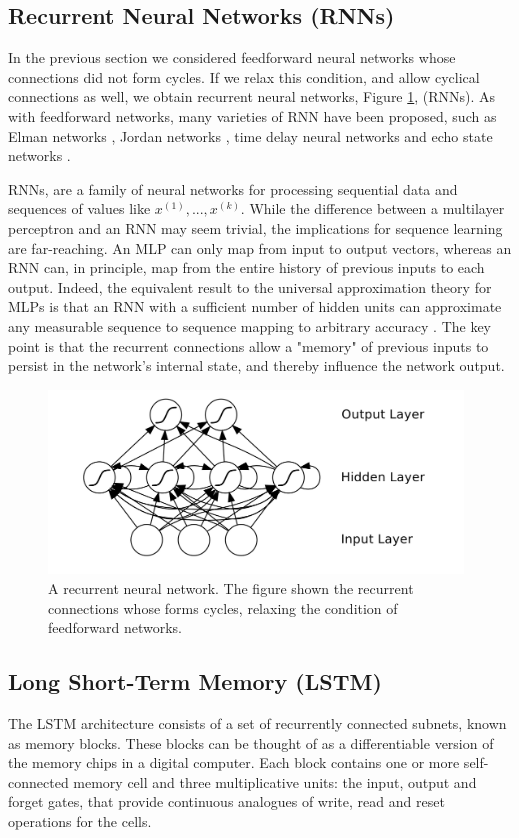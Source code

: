 \subsection{Recurrent Neural Networks (RNNs)}\label{RNN}
In the previous section we considered feedforward neural networks whose connections did not form cycles. If we relax this condition, and allow cyclical connections as well, we obtain recurrent neural networks, Figure \ref{RNN_fig}, (RNNs). As with feedforward networks, many varieties of RNN have been proposed, such as Elman networks \cite{elman1990finding}, Jordan networks \cite{pollack1990recursive}, time delay neural networks \cite{lang1990time} and echo state networks \cite{jaeger2001echo}.

RNNs, are a family of neural networks for processing sequential data and sequences of values like $x^{(1)}, . . . , x^{(k)}$.
While the difference between a multilayer perceptron and an RNN may seem trivial, the implications for sequence learning are far-reaching. An MLP can only map from input to output vectors, whereas an RNN can, in principle, map from the entire history of previous inputs to each output. Indeed, the equivalent result to the universal approximation theory for MLPs is that an RNN with a sufficient number of hidden units can approximate any measurable sequence to sequence mapping to arbitrary accuracy \cite{hammer2000approximation}. The key point is that the recurrent connections allow a "memory" of previous inputs to persist in the network’s internal state, and thereby influence the network output\cite{graves2012supervised}.

\begin{figure}
	\centering
	\includegraphics[width=11cm]{img/RNN.png}
	\caption{A recurrent neural network. The figure shown the recurrent connections whose forms cycles, relaxing the condition of feedforward networks.}
	\label{RNN_fig}
\end{figure}

\subsection{Long Short-Term Memory (LSTM)}\label{LSTM_subs}
The LSTM \cite{hochreiter1997long} architecture consists of a set of recurrently connected subnets, known as memory blocks. These blocks can be thought of as a differentiable version of the memory chips in a digital computer. Each block contains one or more self-connected memory cell and three multiplicative units: the input, output and forget gates, that provide continuous analogues of write, read and reset operations for the cells.

